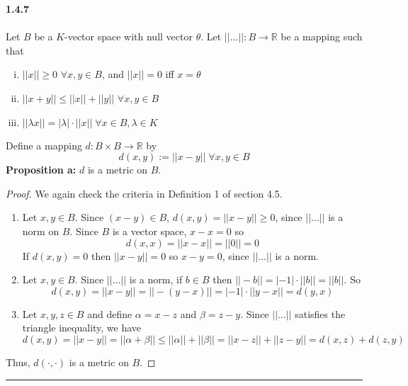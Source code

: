 \documentclass[]{book}
\begin{document}
{\bf 1.4.7} \\ \\
Let $B$ be a $K$-vector space with null vector $\theta$. Let $||...||: B\to \mathbb{R}$ be a mapping such that
\begin{enumerate}[(i)]
\item $||x||\geqslant 0$ $\forall x,y\in B$, and $||x||=0$ iff $x=\theta$
\item $||x+y||\leqslant ||x|| + ||y||$ $\forall x,y\in B$
\item $||\lambda x|| = |\lambda|\cdot ||x|| \; \forall x\in B, \lambda\in K$
\end{enumerate}
Define a mapping $d:B\times B\to \mathbb{R}$ by $$d(x,y):=||x-y||\; \forall x,y\in B$$
{\bf Proposition a:} $d$ is a metric on $B$.
\begin{proof}
We again check the criteria in Definition 1 of section 4.5.
\begin{enumerate}[1.]
\item Let $x,y\in B$. Since $(x-y)\in B$, $d(x,y)=||x-y||\geqslant 0$, since $||\dots ||$ is a norm on $B$. Since $B$ is a vector space, $x-x = 0$ so 
$$d(x,x)=||x-x||=||0||=0$$
If $d(x,y)=0$ then $||x-y||=0$ so $x-y=0$, since $||\dots||$ is a norm.
\item Let $x,y\in B$. Since $||\dots||$ is a norm, if $b\in B$ then $||-b||=|-1|\cdot||b||=||b||$. So $$d(x,y)=||x-y||=||-(y-x)||=|-1|\cdot||y-x||=d(y,x)$$
\item Let $x,y,z\in B$ and define $\alpha=x-z$ and $\beta=z-y$. Since $||\dots||$ satisfies the triangle inequality, we have
$$d(x,y)=||x-y||=||\alpha +\beta|| \leqslant ||\alpha||+||\beta||=||x-z||+||z-y||=d(x,z) + d(z,y)$$
\end{enumerate}
Thus, $d(\cdot,\cdot)$ is a metric on $B$.
\end{proof}

\noindent\rule{15cm}{0.4pt} \\
\end{document}
